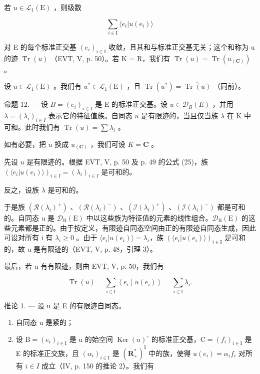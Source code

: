 若 \(u\in \mathcal{L}_1(\mathrm{E})\) ，则级数

\[
\sum_ {i \in \mathrm{I}} \langle e _ {i} | u (e _ {i}) \rangle
\]

对 E 的每个标准正交基 \((e_{i})_{i\in\mathrm{I}}\) 收敛，且其和与标准正交基无关；这个和称为 u 的迹 \(\operatorname{Tr}(u)\) （EVT, V, p. 50）。若 K = R，我们有 \(\operatorname{Tr}(u) = \operatorname{Tr}(u_{(\mathbf{C})})\) 。

设 \(u \in \mathcal{L}_1(\mathrm{E})\) 。我们有 \(u^* \in \mathcal{L}_1(\mathrm{E})\) ，且 \(\operatorname{Tr}(u^*) = \overline{\operatorname{Tr}(u)}\) （同前）。

命题 12. --- 设 \(B = (e_i)_{i \in I}\) 是 E 的标准正交基。设 \(u \in \mathcal{D}_B(E)\) ，并用 \(\lambda = (\lambda_i)_{i \in I}\) 表示它的特征值族。自同态 \(u\) 是有限迹的，当且仅当族 \(\lambda\) 在 K 中可和。此时我们有 \(\operatorname{Tr}(u) = \sum \lambda_i\) 。

如有必要，把 \(u\) 换成 \(u_{(\mathbf{C})}\) ，我们可设 \(K = \mathbf{C}\) 。

先设 \(u\) 是有限迹的。根据 EVT, V, p. 50 及 p. 49 的公式 (25)，族 \((\langle e_i | u(e_i) \rangle)_{i \in I} = (\lambda_i)_{i \in I}\) 是可和的。

反之，设族 \(\lambda\) 是可和的。

于是族 \((\mathcal{R}(\lambda_{i})^{+})\) 、\((\mathcal{R}(\lambda_{i})^{-})\) 、\((\mathcal{I}(\lambda_{i})^{+})\) 、\((\mathcal{I}(\lambda_{i})^{-})\) 都是可和的。自同态 u 是 \(\mathcal{D}_{\mathrm{B}}(\mathrm{E})\) 中以这些族为特征值的元素的线性组合。\(\mathcal{D}_{\mathrm{B}}(\mathrm{E})\) 的这些元素都是正的。由于按定义，有限迹自同态空间由正的有限迹自同态生成，因此可设对所有 i 有 \(\lambda_{i} \geqslant 0\) 。由于 \(\langle e_{i} | u(e_{i}) \rangle = \lambda_{i}\)，族 \((\langle e_{i} | u(e_{i}) \rangle)_{i \in \mathrm{I}}\) 是可和的，故 u 是有限迹的（EVT, V, p. 48，引理 3）。

最后，若 u 有有限迹，则由 EVT, V, p. 50，我们有

\[
\operatorname{Tr} (u) = \sum_ {i \in \mathrm{I}} \left\langle e _ {i} \mid u \left(e _ {i}\right) \right\rangle = \sum_ {i \in \mathrm{I}} \lambda_ {i}.
\]

推论 1. --- 设 u 是 E 的有限迹自同态。

\begin{enumerate}
\def\labelenumi{\alph{enumi})}
\item
  自同态 u 是紧的；
\item
  设 \(\mathrm{B} = (e_i)_{i \in \mathrm{I}}\) 是 u 的始空间 \(\operatorname{Ker}(u)^{\circ}\) 的标准正交基，\(\mathrm{C} = (f_i)_{i \in \mathrm{I}}\) 是 E 的标准正交族，且 \((\alpha_i)_{i \in \mathrm{I}}\) 是 \((\mathbf{R}_+^*)^{\mathrm{I}}\) 中的族，使得 \(u(e_i) = \alpha_i f_i\) 对所有 \(i \in I\) 成立（IV, p. 150 的推论 2）。我们有
\end{enumerate}

